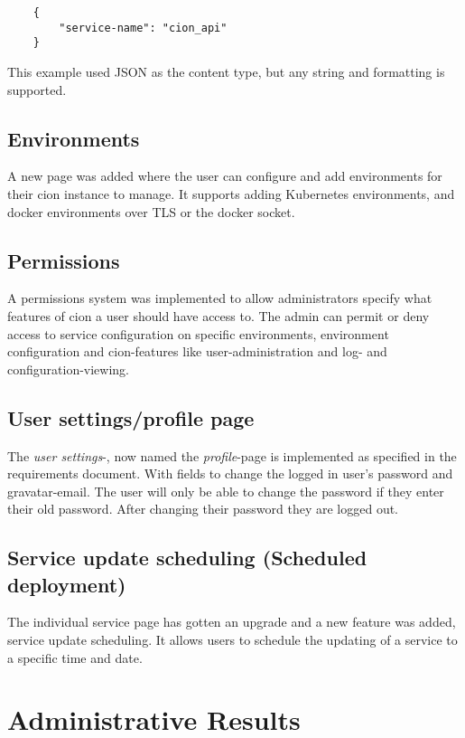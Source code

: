 \begin{verbatim}
    {
        "service-name": "cion_api"
    }
\end{verbatim}

This example used JSON as the content type, but any string and formatting is supported. 

\subsection{Environments}
A new page was added where the user can configure and add environments for their cion instance to manage. It supports adding Kubernetes environments, and docker environments over TLS or the docker socket.


\subsection{Permissions}
A permissions system was implemented to allow administrators specify what features of cion a user should have access to. The admin can permit or deny access to service configuration on specific environments, environment configuration and cion-features like user-administration and log- and configuration-viewing.


\subsection{User settings/profile page}
The \textit{user settings}-, now named the \textit{profile}-page is implemented as specified in the requirements document. With fields to change the logged in user's password and gravatar-email. The user will only be able to change the password if they enter their old password. After changing their password they are logged out.

\subsection{Service update scheduling (Scheduled deployment)}
The individual service page has gotten an upgrade and a new feature was added, service update scheduling. It allows users to schedule the updating of a service to a specific time and date.


\section{Administrative Results}

